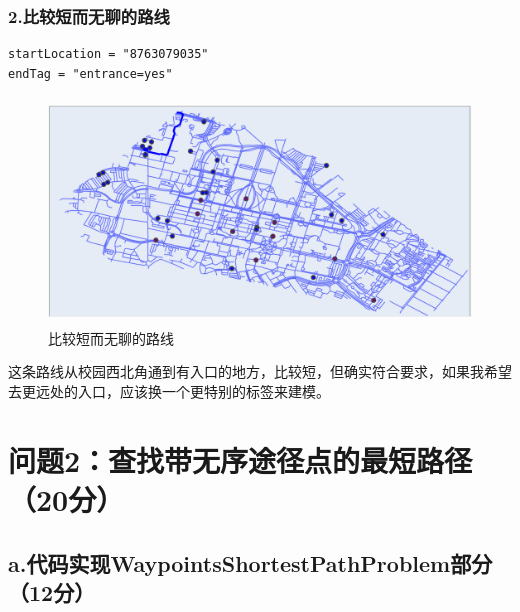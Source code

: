 \documentclass{article}
\begin{document}
\subsubsection*{2.比较短而无聊的路线}
    \begin{lstlisting}
startLocation = "8763079035"
endTag = "entrance=yes"
    \end{lstlisting}
	
	\begin{figure}[H]
		\centering 
		\includegraphics[height=6cm,width=14cm]{3.png}
        \caption{比较短而无聊的路线}
    \end{figure}
这条路线从校园西北角通到有入口的地方，比较短，但确实符合要求，如果我希望去更远处的入口，应该换一个更特别的标签来建模。

\section*{问题2：查找带无序途径点的最短路径（20分）}
\subsection*{a.代码实现WaypointsShortestPathProblem部分（12分）}
 
\end{document}
